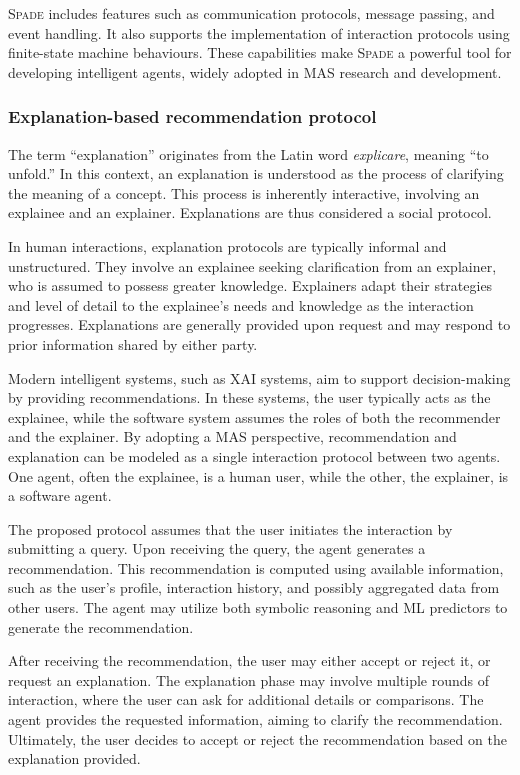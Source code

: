 \textsc{Spade} includes features such as communication protocols, message passing, and event handling.
%
It also supports the implementation of interaction protocols using finite-state machine behaviours.
%
These capabilities make \textsc{Spade} a powerful tool for developing intelligent agents, widely adopted in \gls{MAS} research and development.


\subsubsection{Explanation-based recommendation protocol}
%
The term ``explanation'' originates from the Latin word \emph{explicare}, meaning ``to unfold.''
%
In this context, an explanation is understood as the process of clarifying the meaning of a concept.
%
This process is inherently interactive, involving an explainee and an explainer.
%
Explanations are thus considered a social protocol.

In human interactions, explanation protocols are typically informal and unstructured.
%
They involve an explainee seeking clarification from an explainer, who is assumed to possess greater knowledge.
%
Explainers adapt their strategies and level of detail to the explainee's needs and knowledge as the interaction progresses.
%
Explanations are generally provided upon request and may respond to prior information shared by either party.

Modern intelligent systems, such as \gls{XAI} systems, aim to support decision-making by providing recommendations.
%
In these systems, the user typically acts as the explainee, while the software system assumes the roles of both the recommender and the explainer.
%
By adopting a \gls{MAS} perspective, recommendation and explanation can be modeled as a single interaction protocol between two agents.
%
One agent, often the explainee, is a human user, while the other, the explainer, is a software agent.

The proposed protocol assumes that the user initiates the interaction by submitting a query.
%
Upon receiving the query, the agent generates a recommendation.
%
This recommendation is computed using available information, such as the user’s profile, interaction history, and possibly aggregated data from other users.
%
The agent may utilize both symbolic reasoning and \gls{ML} predictors to generate the recommendation.

%
After receiving the recommendation, the user may either accept or reject it, or request an explanation.
%
The explanation phase may involve multiple rounds of interaction, where the user can ask for additional details or comparisons.
%
The agent provides the requested information, aiming to clarify the recommendation.
%
Ultimately, the user decides to accept or reject the recommendation based on the explanation provided.

